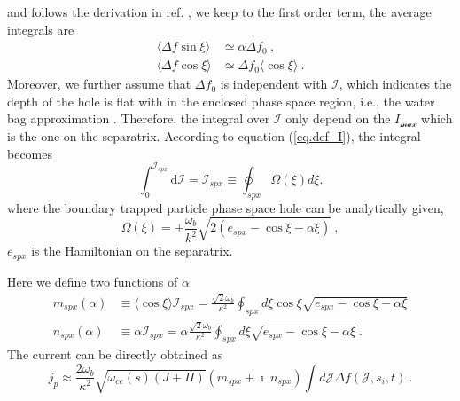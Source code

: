 and follows the derivation in ref. \cite{berk1999}, we keep to the first order term, the average integrals are
\begin{equation}
    \begin{aligned}
    \langle\Delta f \sin \xi \rangle &\simeq \alpha \Delta f_0 ~, \\ 
    \langle \Delta f \cos \xi \rangle &\simeq  \Delta f_0 \langle \cos \xi \rangle ~.
    \end{aligned}
\end{equation}
Moreover, we further assume that $\Delta f_0$ is independent with $\mathcal{I}$, which indicates the depth of the hole is flat with in the enclosed phase space region, i.e., the water bag approximation \cite{omura_theory_2008,hezaveh2021}. Therefore, the integral over $\mathcal{I}$ only depend on the $I_\mathcal{max}$ which is the one on the separatrix. 
According to equation (\ref{eq.def_I}), the integral becomes
\begin{equation}
    \int^{\mathcal{I}_{s p x}}_0 \mathrm{d}\mathcal{I} = \mathcal{I}_{s p x} \equiv \oint_{s p x} \Omega (\xi) d \xi.
\end{equation}
where the boundary trapped particle phase space hole can be analytically given,
\begin{equation}
    \Omega(\xi) = \pm \frac{\omega_b}{k^2} \sqrt{2 (e_{spx}-\cos \xi - \alpha \xi)}~,
\end{equation}
$e_{spx}$ is the Hamiltonian on the separatrix.

Here we define two functions of $\alpha$
\begin{equation}
    \begin{aligned}
        m_{spx}(\alpha) & \equiv \langle \cos \xi \rangle  \mathcal{I}_{spx} = \frac{\sqrt{2} \omega_b}{\kappa^2} \oint_{s p x} d \xi \cos \xi \sqrt{e_{s p x}-\cos \xi-\alpha \xi} \\
        n_{spx}(\alpha) & \equiv \alpha \mathcal{I}_{spx} = \alpha \frac{\sqrt{2} \omega_b}{\kappa^2} \oint_{s p x} d \xi \sqrt{e_{s p x}-\cos \xi-\alpha \xi} ~.
    \end{aligned}
\end{equation}
The current can be directly obtained as 
\begin{equation}\label{eq.adi_J}
    j_p \approx \frac{2 \omega_b}{\kappa^2} \sqrt{\omega_{c e}(s)(J+\Pi)}\left(m_{s p x}+\imath ~ n_{s p x}\right) \int d \mathcal{J} \Delta f(\mathcal{J},s_i,t) ~.
\end{equation}

